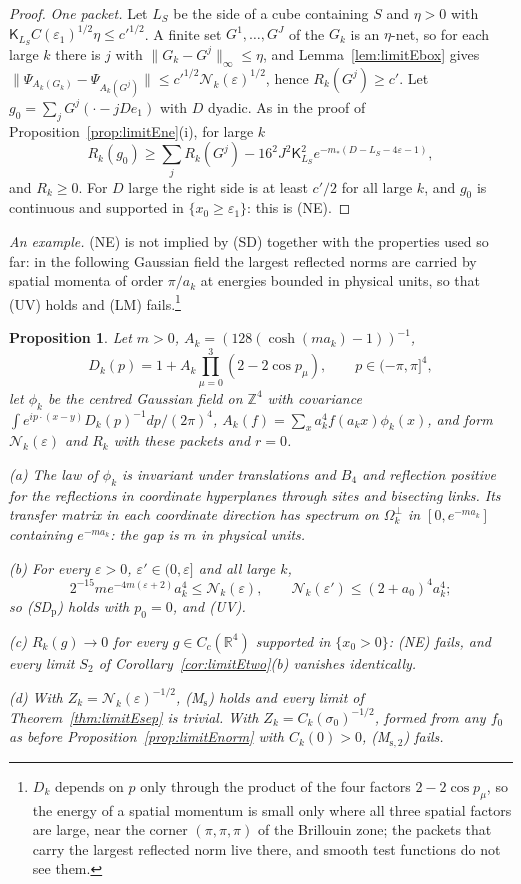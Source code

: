 \documentclass[aps,prd,twocolumn,superscriptaddress,nofootinbib,longbibliography,floatfix,amsmath,amssymb,10pt]{revtex4-2}
\newtheorem{proposition}[theorem]{Proposition}
\theoremstyle{definition}
\theoremstyle{remark}
\newcommand{\R}{\mathbb{R}}
\newcommand{\Z}{\mathbb{Z}}
\begin{document}
\begin{proof}
\emph{One packet.} Let $L_S$ be the side of a cube containing $S$ and
$\eta>0$ with $\mathsf K_{L_S}C(\varepsilon_1)^{1/2}\eta\le c'^{1/2}$. A
finite set $G^1,\dots,G^J$ of the $G_k$ is an $\eta$-net, so for each large
$k$ there is $j$ with $\|G_k-G^j\|_\infty\le\eta$, and
Lemma~\ref{lem:limitEbox} gives $\|\Psi_{A_k(G_k)}-\Psi_{A_k(G^j)}\|\le
c'^{1/2}\mathcal N_k(\varepsilon)^{1/2}$, hence $R_k(G^j)\ge c'$. Let
$g_0=\sum_jG^j(\cdot-jDe_1)$ with $D$ dyadic. As in the proof of
Proposition~\ref{prop:limitEne}(i), for large $k$
\[
R_k(g_0)\ge\sum_jR_k(G^j)-16^2J^2\mathsf K_{L_S}^2e^{-m_*(D-L_S-4
\varepsilon-1)} ,
\]
and $R_k\ge0$. For $D$ large the right side is at least $c'/2$ for all large
$k$, and $g_0$ is continuous and supported in $\{x_0\ge\varepsilon_1\}$:
this is (NE).
\end{proof}

\emph{An example.} (NE) is not implied by (SD) together with the properties
used so far: in the following Gaussian field the largest reflected norms
are carried by spatial momenta of order $\pi/a_k$ at energies bounded in
physical units, so that (UV) holds and (LM) fails.\footnote{$D_k$ depends on $p$ only through the product of the four
factors $2-2\cos p_\mu$, so the energy of a spatial momentum is small only
where all three spatial factors are large, near the corner $(\pi,\pi,\pi)$
of the Brillouin zone; the packets that carry the largest reflected norm live
there, and smooth test functions do not see them.}

\begin{proposition}\label{prop:limitEflat}
Let $m>0$, $A_k=(128(\cosh(ma_k)-1))^{-1}$,
\[
D_k(p)=1+A_k\prod_{\mu=0}^3(2-2\cos p_\mu),\qquad p\in(-\pi,\pi]^4,
\]
let $\phi_k$ be the centred Gaussian field on $\Z^4$ with covariance
$\int e^{ip\cdot(x-y)}D_k(p)^{-1}dp/(2\pi)^4$, $A_k(f)=\sum_xa_k^4f(a_kx)
\phi_k(x)$, and form $\mathcal N_k(\varepsilon)$ and $R_k$ with these
packets and $r=0$.

\textup{(a)} The law of $\phi_k$ is invariant under translations and $B_4$
and reflection positive for the reflections in coordinate hyperplanes through
sites and bisecting links. Its transfer matrix in each coordinate direction
has spectrum on $\Omega_k^\perp$ in $[0,e^{-ma_k}]$ containing
$e^{-ma_k}$: the gap is $m$ in physical units.

\textup{(b)} For every $\varepsilon>0$, $\varepsilon'\in(0,\varepsilon]$ and
all large $k$,
\[
2^{-15}me^{-4m(\varepsilon+2)}a_k^4\le\mathcal N_k(\varepsilon),\qquad
\mathcal N_k(\varepsilon')\le(2+a_0)^4a_k^4 ;
\]
so \textup{(SD$_{\mathrm p}$)} holds with $p_0=0$, and \textup{(UV)}.

\textup{(c)} $R_k(g)\to0$ for every $g\in C_c(\R^4)$ supported in
$\{x_0>0\}$: \textup{(NE)} fails, and every limit $S_2$ of
Corollary~\textup{\ref{cor:limitEtwo}(b)} vanishes identically.

\textup{(d)} With $Z_k=\mathcal N_k(\varepsilon)^{-1/2}$,
\textup{(M$_{\mathrm s}$)} holds and every limit of
Theorem~\textup{\ref{thm:limitEsep}} is trivial. With $Z_k=C_k(\sigma_0)
^{-1/2}$, formed from any $f_0$ as before Proposition~\textup{\ref{prop:limitEnorm}}
with $C_k(0)>0$, \textup{(M$_{\mathrm s,2}$)} fails.
\end{proposition}
\end{document}
